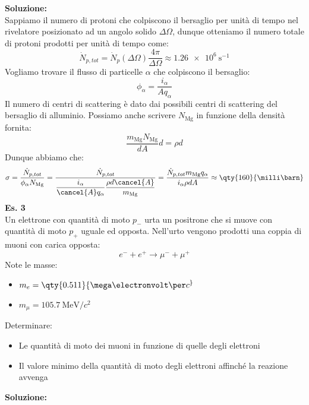 \textbf{Soluzione:}\\
Sappiamo il numero di protoni che colpiscono il bersaglio per unità di tempo nel rivelatore posizionato ad un angolo solido $\Delta \Omega$, dunque otteniamo il numero totale di protoni prodotti per unità di tempo come:
\begin{equation}
  \dot{N}_{p,tot} = \dot{N}_{p}(\Delta \Omega) \dfrac{4 \pi}{\Delta \Omega} \approx \qty{1.26e6}{\second^{-1}}
\end{equation}
Vogliamo trovare il flusso di particelle $\alpha$ che colpiscono il bersaglio:
\begin{equation}
 \phi_\alpha = \dfrac{i_\alpha}{Aq_\alpha}
\end{equation}
Il numero di centri di scattering è dato dai possibili centri di scattering del bersaglio di alluminio.
Possiamo anche scrivere $N_{\text{Mg}}$ in funzione della densità fornita:
\begin{equation}
 \dfrac{m_{\text{Mg}}N_{\text{Mg}}}{dA}d = \rho d
\end{equation}
Dunque abbiamo che:
\begin{equation}
  \sigma = \dfrac{\dot{N}_{p,tot}}{\phi_\alpha N_{\text{Mg}}} = \dfrac{\dot{N}_{p,tot}}{\dfrac{i_\alpha}{\cancel{A}q_\alpha} \dfrac{\rho d \cancel{A}}{m_{\text{Mg}}}} = \dfrac{\dot{N}_{p,tot} m_{\text{Mg}}q_\alpha}{i_\alpha \rho d A} \approx \qty{160}{\milli\barn}
\end{equation}
\textbf{Es. 3}\\
Un elettrone con quantità di moto $p_-$ urta un positrone che si muove con quantità di moto $p_+$ uguale ed opposta. Nell'urto vengono prodotti una coppia di muoni con carica opposta:
\begin{equation}
 e^- + e^+ \rightarrow \mu^- + \mu^+
\end{equation}
Note le masse:
\begin{itemize}
 \item $m_e = \qty{0.511}{\mega\electronvolt\per c^}$
 \item $m_\mu = \qty{105.7}{\mega\electronvolt\per c^2}$
\end{itemize}
Determinare:
\begin{itemize}
  \item Le quantità di moto dei muoni in funzione di quelle degli elettroni
  \item Il valore minimo della quantità di moto degli elettroni affinché la reazione avvenga
\end{itemize}
\textbf{Soluzione:}\\

